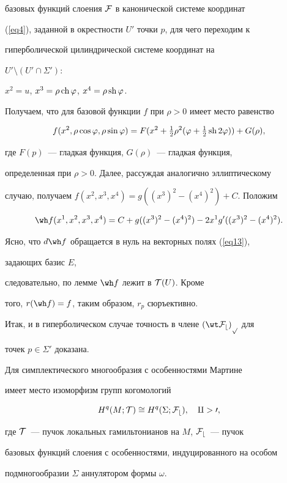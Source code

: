 \begin{pf}
базовых функций слоения $\cal F$ в канонической системе координат


(\ref{eq4}), заданной в окрестности $U'$ точки $p$, для чего переходим к


гиперболической цилиндрической системе координат на


$U'\setminus(U'\cap \Sigma')$:


$x^2=u$, $x^3= \rho \operatorname{ch} \varphi$, $x^4 = \rho \operatorname{sh} \varphi$.


Получаем, что для базовой функции $f$ при $\rho >0$ имеет место равенство


$$


f(x^2,\rho\cos\varphi,\rho\sin\varphi) =


F(x^2 + \tfrac{1}{2}\rho^2(\varphi + \tfrac{1}{2}\sh 2\varphi)) + G(\rho),


$$


где $F(p)$~--- гладкая функция, $G(\rho)$~--- гладкая функция,


определенная при $\rho>0$. Далее, рассуждая аналогично эллиптическому


случаю, получаем $f(x^2,x^3,x^4) = g((x^3)^2 - (x^4)^2) +


C$. Положим


$$


\wh f(x^1,x^2,x^3,x^4) = C + g((x^3)^2 - (x^4)^2) - 2 x^1 g'((x^3)^2 -


(x^4)^2).


$$


Ясно, что $d\wh f$ обращается в нуль на векторных полях (\ref{eq13}),


задающих базис $E$,


следовательно, по лемме $\wh f$ лежит в ${\cal T}(U)$. Кроме


того, $r(\wh f)=f$, таким образом, $r_p$ сюръективно.


Итак, и в гиперболическом случае точность в члене $(\wt\cF_b)_p$ для


точек $p \in


\Sigma'$ доказана.


\end{pf}





\begin{cor} \label{cor2}


Для симплектического многообразия с особенностями Мартине


имеет место изоморфизм групп когомологий


$$


H^q(M;\cT) \cong H^q(\Sigma;\cF_b), \quad q> 0,


$$


где ${\cal T}$~--- пучок локальных гамильтонианов на $M$, $\cal F_b$~--- пучок


базовых функций слоения с особенностями, индуцированного на особом


подмногообразии $\Sigma$ аннулятором формы $\omega$.


\end{cor}





